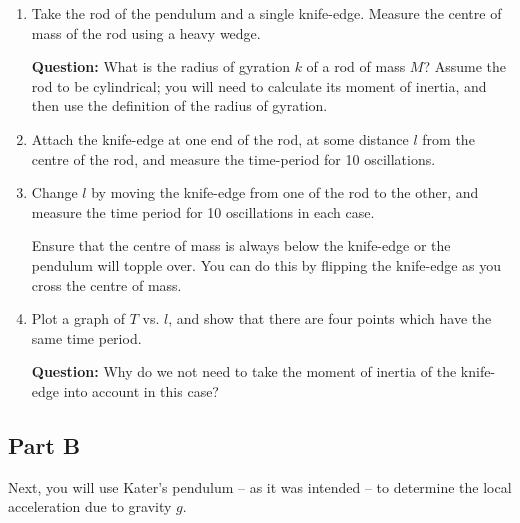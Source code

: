 \begin{enumerate}
\itemsep0em
    \item Take the rod of the pendulum and a single knife-edge. Measure the centre of mass of the rod using a heavy wedge.
    
    \begin{question}
    \textbf{Question:} What is the radius of gyration $k$ of a rod of mass $M$? Assume the rod to be cylindrical; you will need to calculate its moment of inertia, and then use the definition of the radius of gyration.
    \end{question}
    
    \item Attach the knife-edge at one end of the rod, at some distance $l$ from the centre of the rod, and measure the time-period for 10 oscillations.
    
    \item Change $l$ by moving the knife-edge from one of the rod to the other, and measure the time period for 10 oscillations in each case.\
    
    \begin{imp}
    Ensure that the centre of mass is always below the knife-edge or the pendulum will topple over. You can do this by flipping the knife-edge as you cross the centre of mass.
    \end{imp}
    
    \item Plot a graph of $T$ vs. $l$, and show that there are four points which have the same time period. 
    
    \begin{question}
    \textbf{Question:} Why do we not need to take the moment of inertia of the knife-edge into account in this case?
    \end{question}
\end{enumerate}

\subsection*{Part B}

Next, you will use Kater's pendulum -- as it was intended -- to determine the local acceleration due to gravity $g$.

